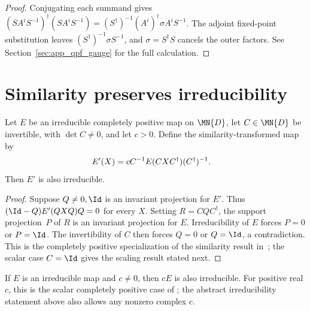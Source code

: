 \begin{proof}\leanok
    Conjugating each summand gives
    $(SA^iS^{-1})^\dagger(SA^iS^{-1})
        =(S^\dagger)^{-1}(A^i)^\dagger\sigma A^iS^{-1}$.
    The adjoint fixed-point substitution leaves
    $(S^\dagger)^{-1}\sigma S^{-1}$, and $\sigma=S^\dagger S$ cancels
    the outer factors. See Section~\ref{sec:app_qpf_gauge} for the full
    calculation.
\end{proof}

\section{Similarity preserves irreducibility}

\begin{lemma}%
    \label{lem:similarity_irred}
    \leanok
    Let $E$ be an irreducible completely positive map on $\MN{D}$,
    let $C \in \MN{D}$ be invertible, with $\det C \neq 0$, and let
    $c > 0$.
    Define the similarity-transformed map by
    \begin{align}
        E'(X)
         & = cC^{-1}E(CXC^\dagger)(C^\dagger)^{-1}.
        \notag
    \end{align}
    Then $E'$ is also irreducible.
\end{lemma}

\begin{proof}
    \leanok
    Suppose $Q\neq0,\Id$ is an invariant projection for $E'$.
    Thus $(\Id-Q)E'(QXQ)Q=0$ for every $X$.
    Setting $R = CQC^\dagger$, the support projection~$P$ of $R$
    is an invariant projection for $E$.
    Irreducibility of $E$ forces $P = 0$ or $P = \Id$.
    The invertibility of $C$ then forces $Q = 0$ or $Q = \Id$,
    a contradiction.
    This is the completely positive specialization of the similarity result
    in~\cite[Proposition~6.6]{Wolf2012Quantum}; the scalar case $C=\Id$
    gives the scaling result stated next.
\end{proof}



\begin{theorem}%
    \label{thm:irred_map_smul}
    \leanok
    If $E$ is an irreducible map and $c \neq 0$, then $cE$
    is also irreducible.
    For positive real $c$, this is the scalar completely positive case of
    \cite[Proposition~6.6]{Wolf2012Quantum}; the abstract irreducibility
    statement above also allows any nonzero complex $c$.
\end{theorem}

